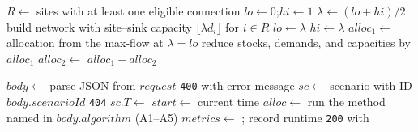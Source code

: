 \documentclass[11pt]{article}
\begin{document}
\begin{algorithm}[H]
\caption{Max-min fair allocation (A5), using binary search}
\begin{algorithmic}[1]
  \State $R \gets$ sites with at least one eligible connection 
  \State $lo \gets 0$;\quad $hi \gets 1$
   
    \State $\lambda \gets (lo + hi)/2$
    \State build network with site--sink capacity $\lfloor \lambda d_i \rfloor$ for $i \in R$
      \State $lo \gets \lambda$ 
    \Else
      \State $hi \gets \lambda$
    \EndIf
  \EndFor
  \State $alloc_1 \gets$ allocation from the max-flow at $\lambda = lo$
  \State reduce stocks, demands, and capacities by $alloc_1$
  \State $alloc_2 \gets$  
  \State \Return $alloc_1 + alloc_2$
\EndFunction
\end{algorithmic}
\end{algorithm}

\begin{algorithm}[H]
\caption{Handling a web allocation request (backend)}
\begin{algorithmic}[1]
  \State $body \gets$ parse JSON from $request$
     \State \Return \texttt{400} with error message
  \EndIf
  \State $sc \gets$ scenario with ID $body.scenarioId$
   \State \Return \texttt{404} \EndIf
     \State $sc.T \gets$  
  \EndIf
  \State $start \gets$ current time
  \State $alloc \gets$ run the method named in $body.algorithm$ (A1--A5)
  \State $metrics \gets$ ; record runtime
  \State {}
  \State \Return \texttt{200} with 
\EndFunction
\end{algorithmic}
\end{algorithm}
\end{document}
